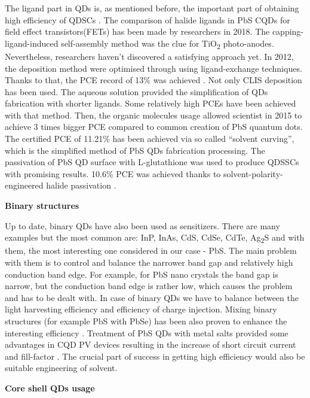 \begin{enumerate}
The ligand part in QDs is, as mentioned before, the important part of obtaining high efficiency of QDSCs \cite{Shang2016}. The comparison of halide ligands in PbS CQDs for field effect transistors(FETs) has been made by researchers in 2018\cite{Balazs2018}. The capping-ligand-induced self-assembly method was the clue for TiO\textsubscript{2} photo-anodes\cite{HuashangRao2018}. Nevertheless, researchers haven't discovered a satisfying approach yet. In 2012, the deposition method were optimised through using ligand-exchange techniques.\cite{Cheng2012} Thanks to that, the PCE record of 13\% was achieved \cite{W.Feng2018} . Not only CLIS deposition has been used. The aqueous solution provided the simplification of QDs fabrication with shorter ligands. Some relatively high PCEs have been achieved with that method. Then, the organic  molecules usage allowed scientist in 2015 to achieve 3 times bigger PCE compared to common creation of PbS quantum dots.\cite{Infante2015} The certified PCE of 11.21\% has been achieved via so called ``solvent curving'', which is the simplified method of PbS QDs fabrication processing. The passivation of PbS QD surface with
L-glutathione was used to produce QDSSCs with promising results.\cite{Cordes2016} 10.6\% PCE was achieved thanks to solvent-polarity-engineered halide passivation \cite{OleksandrVoznyy2016} .


\textbf{Binary structures}

Up to date, binary QDs have also been used as sensitizers. There are
many examples but the most common are: InP, InAs, CdS, CdSe, CdTe,
Ag\textsubscript{2}S and with them, the most interesting one considered
in our case - PbS.\cite{P.Zhao2015} \cite{Y.Yu2008} The main problem with
them is to control and balance the narrower band gap and relatively high
conduction band edge. For example, for PbS nano crystals the band gap is
narrow, but the conduction band edge is rather low, which causes the
problem and has to be dealt with. In case of binary QDs we have to
balance between the light harvesting efficiency and efficiency of charge
injection. Mixing binary structures (for example PbS with PbSe) has been
also proven to enhance the interesting efficiency\cite{ShujuanHuangb22019} \cite{Fan}. Treatment of PbS QDs with metal salts provided some advantages in CQD PV devices resulting in the increase of short circuit current and fill-factor \cite{Maurano2016} .
The crucial part of success in getting high efficiency would also be
suitable engineering of solvent\cite{YuehuaYang2017}.

\textbf{Core shell QDs usage}


\end{enumerate}
